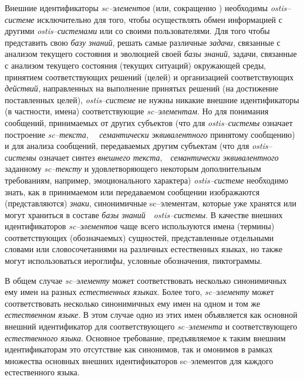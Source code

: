 Внешние идентификаторы \textit{sc--элементов} (или, сокращенно ) необходимы \mbox{\textit{ostis--системе}} исключительно для того, чтобы осуществлять обмен информацией с другими \textit{ostis--системами} или со своими пользователями. Для того чтобы представить свою \textit{базу знаний}, решать самые различные \textit{задачи}, связанные с анализом текущего состояния и эволюцией своей \textit{базы знаний}, задачи, связанные с анализом текущего состояния (текущих ситуаций) окружающей среды, принятием соответствующих решений (целей) и организацией соответствующих \textit{действий}, направленных на выполнение принятых решений (на достижение поставленных целей), \textit{ostis--системе} не нужны никакие внешние идентификаторы (в частности, имена) соответствующие \textit{sc--элементам}. Но для понимания сообщений, принимаемых от других субъектов (что для \textit{ostis--системы} означает построение \textit{sc--текста},~~ \textit{семантически эквивалентного} принятому сообщению) и для анализа сообщений, передаваемых другим субъектам (что для \textit{ostis--системы} означает синтез \textit{внешнего текста},~~\textit{семантически эквивалентного} заданному \textit{sc--тексту} и удовлетворяющего некоторым дополнительным требованиям, например, эмоционального характера) \textit{ostis--системе} необходимо знать, как в принимаемом или передаваемом сообщении изображаются (представляются) \textit{знаки}, синонимичные sc--элементам, которые уже хранятся или могут храниться в составе \textit{базы знаний}~~\textit{ostis--системы}. В качестве внешних идентификаторов \textit{sc--элементов} чаще всего используются имена (термины) соответствующих (обозначаемых) сущностей, представленные отдельными словами или словосочетаниями на различных естественных языках, но также могут использоваться иероглифы, условные обозначения, пиктограммы.

В общем случае \textit{sc--элементу} может соответствовать несколько синонимичных ему имен на разных \textit{естественных языках}. Более того, \textit{sc--элементу} может соответствовать несколько синонимичных ему имен на одном и том же \textit{естественном языке}. В этом случае одно из этих имен объявляется как основной внешний идентификатор для соответствующего \textit{sc--элемента} и соответствующего \textit{естественного языка}. Основное требование, предъявляемое к таким внешним идентификаторам это отсутствие как синонимов, так и омонимов в рамках множества основных внешних идентификаторов sc--элементов для каждого естественного языка. 

